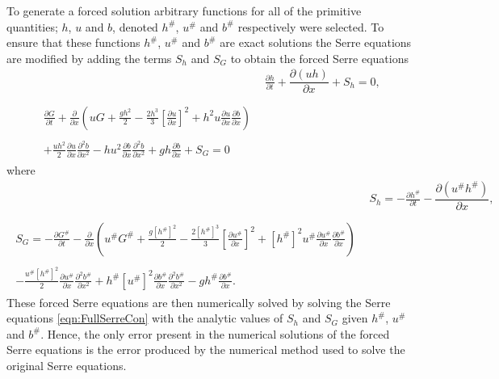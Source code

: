 \documentclass[times]{elsarticle}
\begin{document}
To generate a forced solution arbitrary functions for all of the primitive quantities; $h$, $u$ and $b$, denoted $h^\#$, $u^\#$ and $b^\#$ respectively were selected. To ensure that these functions $h^\#$, $u^\#$ and $b^\#$ are exact solutions the Serre equations are modified by adding the terms $S_{h} $ and $S_{G}$ to obtain the forced Serre equations
\begin{align*}
& \frac{\partial h}{\partial t} + \dfrac{\partial (uh)}{\partial x} + S_{h}  = 0 ,  \\ \nonumber \\
\begin{split}
\frac{\partial G}{\partial t}  + \frac{\partial}{\partial x} \left( {u} G + \frac{gh^2}{2} - \frac{2h^3}{3} \left[ \frac{\partial {u}}{\partial x} \right]^2 + h^2 {u}\frac{\partial {u}}{\partial x}\frac{\partial b}{\partial x} \right) \\ \\ + \frac{uh^2 }{2}\frac{\partial {u}}{\partial x} \frac{\partial^2 b}{\partial x^2}  - h {u}^2\frac{\partial b}{\partial x}\frac{\partial^2 b}{\partial x^2} + gh\frac{\partial b}{\partial x} + S_{G} = 0
\end{split}
\end{align*}
where
\begin{align*}
&  S_{h} = -\frac{\partial h^\#}{\partial t} - \dfrac{\partial (u^\#h^\#)}{\partial x} ,  \\ \nonumber \\
\begin{split}
S_{G} = -\frac{\partial G^\#}{\partial t}  - \frac{\partial}{\partial x} \left( {u}^\# G^\# + \frac{g\left[h^\#\right]^2}{2} - \frac{2\left[h^\#\right]^3}{3} \left[\frac{\partial {u}^\#}{\partial x}\right]^2 + \left[h^\#\right]^2 {u^\#}\frac{\partial {u}^\#}{\partial x}\frac{\partial b^\#}{\partial x} \right) \\ \\ - \frac{{u}^\#\left[h^\#\right]^2 }{2} \frac{\partial {u}^\#}{\partial x} \frac{\partial^2 b^\#}{\partial x^2}  + h^\# {\left[u^\#\right]}^2\frac{\partial b^\#}{\partial x}\frac{\partial^2 b^\#}{\partial x^2} - gh^\#\frac{\partial b^\#}{\partial x}.
\end{split}
\end{align*} 
These forced Serre equations are then numerically solved by solving the Serre equations \eqref{eqn:FullSerreCon} with the analytic values of $S_{h}$ and $S_{G}$ given $h^\#$, $u^\#$ and $b^\#$. Hence, the only error present in the numerical solutions of the forced Serre equations is the error produced by the numerical method used to solve the original Serre equations.
\end{document}
